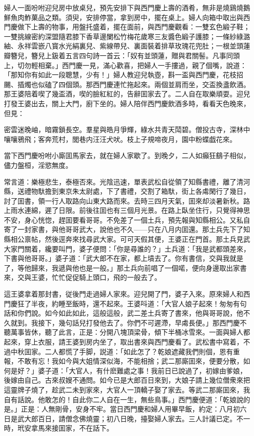 婦人一面吩咐迎兒房中放桌兒，預先安排下與西門慶上壽的酒肴，無非是燒鷄燒鵝鮮魚肉鮓菓品之類。須臾，安排停當，拿到房中，擺在桌上。婦人向箱中取出與西門慶做下上壽的物事，用盤托盛着，擺在面前，與西門慶觀看：一雙玄色緞子鞋；一雙挑線密約深盟隨君膝下香草邊闌松竹梅花歲寒三友醬色緞子護膝；一條紗綠潞紬、永祥雲嵌八寳水光絹裏兒、紫線帶兒、裏面裝着排草玫瑰花兜肚；一根並頭蓮瓣簪兒，簪兒上鈒着五言四句詩一首云：「奴有並頭蓮，贈與君關髻。凡事同頭上，切勿輕相棄。」西門慶一見，滿心歡喜，把婦人一手摟過，親了個嘴，說道：「那知你有如此一段聰慧，少有！」婦人教迎兒執壺，斟一盃與西門慶，花枝招颺、插燭也似磕了四個頭。那西門慶連忙拖起來。兩個並肩而坐，交盃換盞飲酒。那王婆陪着喫了幾盃酒，喫的臉紅紅的，告辭囬家去了。二人自在取樂頑耍。迎兒打發王婆出去，關上大門，廚下坐的。婦人陪伴西門慶飲酒多時，看看天色晚來，但見：
\begin{myquote}
密雲迷晚岫，暗霧鎖長空。羣星與皓月爭輝，綠水共青天鬦碧。僧投古寺，深林中嚷嚷鴉飛；客奔荒村，閭巷内汪汪犬吠。枝上子規啼夜月，園中粉蝶戯花來。
\end{myquote}

當下西門慶吩咐小廝囬馬家去，就在婦人家歇了。到晚夕，二人如癲狂鷂子相似，儘力盤桓，淫慾無度。

常言道：樂極悲生，泰極否來。光陰迅速，單表武松自從領了知縣書禮，離了清河縣，送禮物馱擔到東京朱太尉處，下了書禮，交割了箱馱，街上各䖏閑行了幾日，討了囬書，領一行人取路向山東大路而來。去時三四月天氣，囬來却淡暑新秋。路上雨水連綿，遲了日限。前後往囬也有三個月光景。在路上臥坐住行，只覺得神思不安，身心恍惚，趕囬要看哥哥。不免差了一個土兵，預先報與知縣相公。又私自寄了一封家書，與他哥哥武大，說他也不久——只在八月内囬還。那土兵先下了知縣相公禀帖，然後逕奔來找尋武大家。可可天假其便，王婆正在門首。那土兵見武大家門關着，纔要叫門，婆子便問：「你是尋誰的？」土兵道：「我是武都頭差來，下書與他哥哥。」婆子道：「武大郎不在家，都上墳去了。你有書信，交與我就是了，等他歸來，我遞與他也是一般。」那土兵向前唱了一個喏，便向身邊取出家書來，交與王婆，忙忙促促騎上頭口，飛的一般去了。

這王婆拿着那封書，従後門走過婦人家來。迎兒開了門，婆子入來。原來婦人和西門慶狂了半夜，約睡至飯時，還不起來。王婆呌道：「大官人娘子起來！匆匆有句話和你們說。如今如此如此，這般這般，武二差土兵寄了書來，他與哥哥說，他不久就到。我接下，幾句話兒打發他去了。你們不可遲滯，早䖏長便。」那西門慶不聽萬事皆休，聽了此言，正是：分開八塊頂梁骨，傾下半桶冰雪來。一面與婦人都起來，穿上衣服，請王婆到房内坐了，取出書來與西門慶看了。武松書中寫着，不過中秋囬家。二人都慌了手脚，説道：「如此怎了？乾娘遮藏我們則個，恩有重報，不敢有忘！我如今與大姐情深似海，不能相捨；武二那廝囬來，便要分散，如何是好？」婆子道：「大官人，有什麽難處之事！我前日已說過了，初嫁由爹娘，後嫁由自己。古來叔嫂不通問。如今已是大郎百日來到，大娘子請上幾位僧衆來把這靈牌子燒了，趁武二未到家來，大官人一頂轎子娶了家去。等武二那廝囬來，我自有話說。他敢怎的！自此你二人自在一生，無些鳥事。」西門慶便道：「乾娘說的是。」正是：人無剛骨，安身不牢。當日西門慶和婦人用畢早飯，約定：八月初六日是武大郎百日，請僧念佛燒靈；初八日晚，擡娶婦人家去。三人計議已定。不一時，玳安拿馬來接囬家，不在話下。

